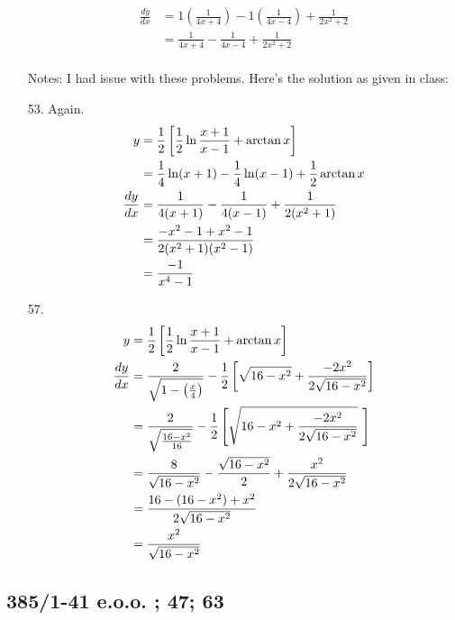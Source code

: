 \documentclass[11pt]{article}
\begin{document}
\begin{enumerate}
\begin{align}
			\frac{dy}{dx} &= 1\left(\frac{1}{4x+4}\right) - 
			1\left(\frac{1}{4x-4}\right) + \frac{1}{2x^2+2} \\
			&= \frac{1}{4x+4} - \frac{1}{4x-4} + \frac{1}{2x^2+2}
		\end{align}
		\\ Notes: I had issue with these problems.  Here's the solution as
		given in class:
	\item[53. ] Again.
		\begin{align}
			\setcounter{equation}{0}
			y &= \frac{1}{2}\left[\frac{1}{2}\ln\frac{x+1}{x-1}+\arctan x\right] \\
			&= \frac{1}{4}\ln(x+1) - \frac{1}{4} \ln (x-1) + \frac{1}{2}\arctan x \\
			\frac{dy}{dx} &= \frac{1}{4(x+1)} - \frac{1}{4(x-1)}+\frac{1}{2(x^2+1)} \\
			&= \frac{-x^2-1+x^2-1}{2(x^2+1)(x^2-1)} \\
			&= \frac{-1}{x^4-1}
		\end{align}
	\item[57. ]
		\begin{align}
			\setcounter{equation}{0}
			y &= \frac{1}{2}\left[\frac{1}{2}\ln\frac{x+1}{x-1}+\arctan x\right] \\
			\frac{dy}{dx} &= \frac{2}{\sqrt{1-\left(\frac{x}{4}\right)}} 
			- \frac{1}{2}\left[\sqrt{16-x^2} + \frac{-2x^2}{2\sqrt{16-x^2}}\right] \\
			&= \frac{2}{\sqrt{\frac{16-x^2}{16}}} - \frac{1}{2}\left[\sqrt{16-x^2
			+ \frac{-2x^2}{2\sqrt{16-x^2}}}\ \right] \\
			&= \frac{8}{\sqrt{16-x^2}} - \frac{\sqrt{16-x^2}}{2} + \frac{x^2}
			{2\sqrt{16-x^2}} \\
			&= \frac{16 - (16-x^2)+x^2}{2\sqrt{16-x^2}} \\
			&= \frac{x^2}{\sqrt{16-x^2}}
		\end{align}
	\end{enumerate}
	\subsection{385/1-41 e.o.o. ; 47; 63}
\end{document}
